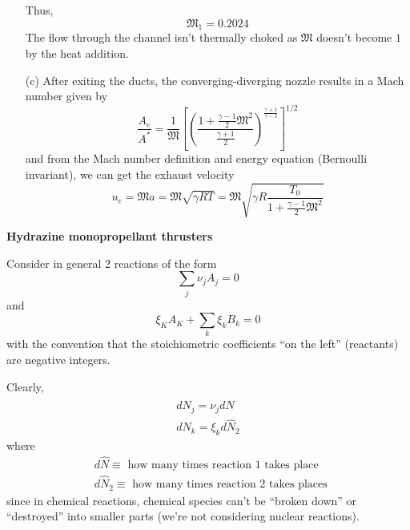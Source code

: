 \documentclass[10pt]{amsart}
\begin{document}
\begin{multicols*}{2}
\begin{enumerate}
Thus,
\[
\mathfrak{M}_1 = 0.2024
\]
The flow through the channel isn't thermally choked as $\mathfrak{M}$ doesn't become $1$ by the heat addition.  
\item[(c)] After exiting the ducts, the converging-diverging nozzle results in a Mach number given by
\[
\frac{A_e}{A^*} = \frac{1}{\mathfrak{M}} \left[ \left( \frac{1 + \frac{\gamma-1}{2} \mathfrak{M}^2 }{ \frac{\gamma+1}{2} } \right)^{\frac{\gamma+1}{\gamma-1} } \right]^{1/2}
\]
and from the Mach number definition and energy equation (Bernoulli invariant), we can get the exhaust velocity
\[
u_e = \mathfrak{M}a = \mathfrak{M}\sqrt{\gamma RT} = \mathfrak{M} \sqrt{ \gamma R \frac{ T_0 }{ 1 + \frac{\gamma-1}{2} \mathfrak{M}^2 } }
\]
\end{enumerate}


\textbf{Hydrazine monopropellant thrusters}

Consider in general 2 reactions of the form 
\[
\sum_j \nu_j A_j = 0 
\]
and 
\[
\xi_K A_K + \sum_k \xi_k B_k = 0 
\]
with the convention that the stoichiometric coefficients ``on the left'' (reactants) are negative integers.  

Clearly, 
\[
\begin{gathered}
  dN_j = \nu_j d\widehat{N} \\ 
  dN_k = \xi_k d\widehat{N}_2
\end{gathered}
\]
where 
\[
\begin{aligned}
  & d\widehat{N} \equiv \text{ how many times reaction 1 takes place } \\ 
  & d\widehat{N}_2 \equiv \text{ how many times reaction 2 takes places }
\end{aligned}
\]
since in chemical reactions, chemical species can't be ``broken down'' or ``destroyed'' into smaller parts (we're not considering nuclear reactions).  


\end{multicols*}
\end{document}
